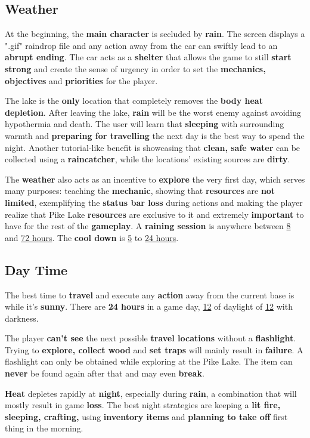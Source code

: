 		\subsection{Weather}
				\par At the beginning, the \textbf{main character} is secluded by \textbf{rain}. The screen displays a ".gif" raindrop file and any action away from the car can swiftly lead to an \textbf{abrupt ending}. The car acts as a \textbf{shelter} that allows the game to still \textbf{start strong} and create the sense of urgency in order to set the \textbf{mechanics, objectives} and \textbf{priorities} for the player. 
			\par The lake is the \textbf{only} location that completely removes the \textbf{body heat depletion}. After leaving the lake,\textbf{ rain} will be the worst enemy against avoiding hypothermia and death. The user will learn that \textbf{sleeping} with surrounding warmth and \textbf{preparing for travelling} the next day is the best way to spend the night. Another tutorial-like benefit is showcasing that \textbf{clean, safe water} can be collected using a \textbf{raincatcher}, while the locations' existing sources are \textbf{dirty}.
			\par The \textbf{weather} also acts as an incentive to \textbf{explore} the very first day, which serves many purposes: teaching the \textbf{mechanic}, showing that \textbf{resources} are \textbf{not limited}, exemplifying the \textbf{status bar loss} during actions and making the player realize that Pike Lake \textbf{resources} are exclusive to it and extremely \textbf{important} to have for the rest of the \textbf{gameplay}. A \textbf{raining session} is anywhere between \underline{8} and \underline{72 hours}. The \textbf{cool down} is \underline{5} to \underline{24 hours}.
		
		\subsection{Day Time}
			\par The best time to \textbf{travel} and execute any \textbf{action} away from the current base is while it's \textbf{sunny}. There are \textbf{24 hours} in a game day, \underline{12} of daylight of \underline{12} with darkness.
			\par The player \textbf{can't see} the next possible \textbf{travel locations} without a \textbf{flashlight}. Trying to \textbf{explore, collect wood} and \textbf{set traps} will mainly result in \textbf{failure}. A flashlight can only be obtained while exploring at the Pike Lake. The item can \textbf{never} be found again after that and may even \textbf{break}.
			\par \textbf{Heat} depletes rapidly at \textbf{night}, especially during \textbf{rain}, a combination that will mostly result in game \textbf{loss}. The best night strategies are keeping a \textbf{lit fire, sleeping, crafting,} using \textbf{inventory items} and \textbf{planning to take off} first thing in the morning. 
		
